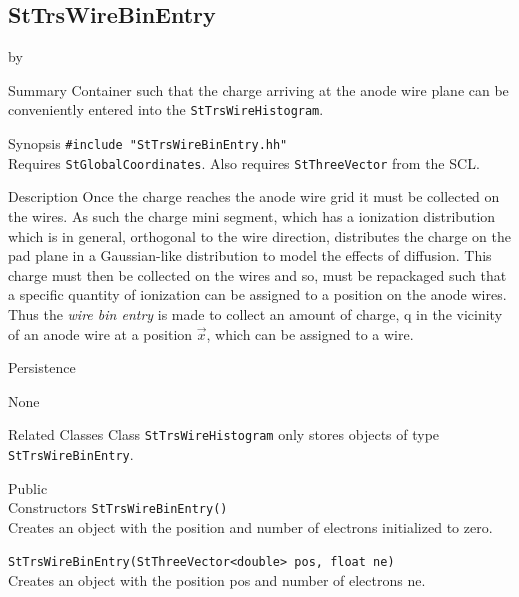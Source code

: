\documentclass[twoside]{article}
\newcommand{\comp}[1]{\texttt{#1}}%
\newcommand{\entrylabel}[1]{\mbox{\textbf{{#1}}}\hfil}%
\newenvironment{entry}
{\begin{list}{}%
    {\renewcommand{\makelabel}{\entrylabel}%
     \setlength{\labelwidth}{90pt}%
     \setlength{\leftmargin}{\labelwidth}
     \advance\leftmargin by \labelsep%
      }%
    }%
  {\end{list}}
\newcommand{\Entrylabel}[1]%
{\raisebox{0pt}[1ex][0pt]{\makebox[\labelwidth][l]%
    {\parbox[t]{\labelwidth}{\hspace{0pt}\textbf{{#1}}}}}}
\newenvironment{Entry}%
{\renewcommand{\entrylabel}{\Entrylabel}\begin{entry}}%
  {\end{entry}}
\begin{document}
%
%
\subsection{StTrsWireBinEntry} 
\label{sec:stTrsWireBinEntry}

\begin{Entry}
\item[Summary]
  Container such that the charge arriving at the anode wire plane can
  be conveniently entered into the \comp{StTrsWireHistogram}.


\item[Synopsis]
  \verb+#include "StTrsWireBinEntry.hh"+\\
  Requires \comp{StGlobalCoordinates}.  Also requires
  \comp{StThreeVector} from the SCL.

\item[Description]
  Once the charge reaches the anode wire grid it must be collected on
  the wires.  As such the charge mini segment, which has a ionization
  distribution which is in general, orthogonal to the wire direction,
  distributes the charge on the pad plane in a Gaussian-like distribution
  to model the effects of diffusion.  This charge must then be collected
  on the wires and so, must be repackaged such that a specific quantity of
  ionization can be assigned to a position on the anode wires.  Thus the
  {\em wire bin entry} is made to collect an amount of charge, q in the vicinity of
  an anode wire at a position $\vec{x}$, which can be assigned to a wire.
  
\item[Persistence]

  None

\item[Related Classes]
  Class \comp{StTrsWireHistogram} only stores
  objects of type \comp{StTrsWireBinEntry}.

\item[Public \\ Constructors]
   \verb+StTrsWireBinEntry()+\\
   Creates an object with the position and number of electrons initialized
   to zero.

   \verb+StTrsWireBinEntry(StThreeVector<double> pos, float ne)+\\
   Creates an object with the position pos and number of electrons ne.


\end{Entry}
\end{document}

